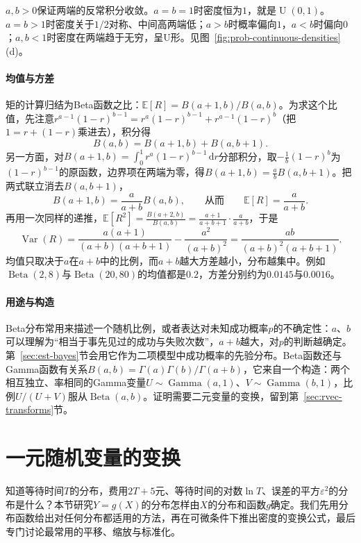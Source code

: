$a,b>0$保证两端的反常积分收敛。$a=b=1$时密度恒为$1$，就是$\operatorname{U}(0,1)$。$a=b>1$时密度关于$1/2$对称、中间高两端低；$a>b$时概率偏向$1$，$a<b$时偏向$0$；$a,b<1$时密度在两端趋于无穷，呈U形。见图~\ref{fig:prob-continuous-densities}(d)。

\paragraph{均值与方差}
矩的计算归结为Beta函数之比：$\mathbb{E}[R]=B(a+1,b)/B(a,b)$。为求这个比值，先注意$r^{a-1}(1-r)^{b-1}=r^{a}(1-r)^{b-1}+r^{a-1}(1-r)^{b}$（把$1=r+(1-r)$乘进去），积分得
\[
  B(a,b)=B(a+1,b)+B(a,b+1).
\]
另一方面，对$B(a+1,b)=\int_0^1r^a(1-r)^{b-1}\,\mathrm{d}r$分部积分，取$-\frac1b(1-r)^b$为$(1-r)^{b-1}$的原函数，边界项在两端为零，得$B(a+1,b)=\frac abB(a,b+1)$。把两式联立消去$B(a,b+1)$，
\[
  B(a+1,b)=\frac{a}{a+b}B(a,b),\qquad\text{从而}\qquad\mathbb{E}[R]=\frac{a}{a+b}.
\]
再用一次同样的递推，$\mathbb{E}[R^2]=\frac{B(a+2,b)}{B(a,b)}=\frac{a+1}{a+b+1}\cdot\frac{a}{a+b}$，于是
\[
  \operatorname{Var}(R)=\frac{a(a+1)}{(a+b)(a+b+1)}-\frac{a^2}{(a+b)^2}=\frac{ab}{(a+b)^2(a+b+1)}.
\]
均值只取决于$a$在$a+b$中的比例，而$a+b$越大方差越小，分布越集中。例如$\operatorname{Beta}(2,8)$与$\operatorname{Beta}(20,80)$的均值都是$0.2$，方差分别约为$0.0145$与$0.0016$。

\paragraph{用途与构造}
Beta分布常用来描述一个随机比例，或者表达对未知成功概率$p$的不确定性：$a$、$b$可以理解为“相当于事先见过的成功与失败次数”，$a+b$越大，对$p$的判断越确定。第~\ref{sec:est-bayes}节会用它作为二项模型中成功概率的先验分布。Beta函数还与Gamma函数有关系$B(a,b)=\Gamma(a)\Gamma(b)/\Gamma(a+b)$，它来自一个构造：两个相互独立、率相同的Gamma变量$U\sim\operatorname{Gamma}(a,1)$、$V\sim\operatorname{Gamma}(b,1)$，比例$U/(U+V)$服从$\operatorname{Beta}(a,b)$。证明需要二元变量的变换，留到第~\ref{sec:rvec-transforms}节。

\section{一元随机变量的变换}
\label{sec:prob-univariate-transforms}
\label{sec:rv-pushforward}

知道等待时间$T$的分布，费用$2T+5$元、等待时间的对数$\ln T$、误差的平方$\varepsilon^2$的分布是什么？本节研究$Y=g(X)$的分布怎样由$X$的分布和函数$g$确定。我们先用分布函数给出对任何分布都适用的方法，再在可微条件下推出密度的变换公式，最后专门讨论最常用的平移、缩放与标准化。

